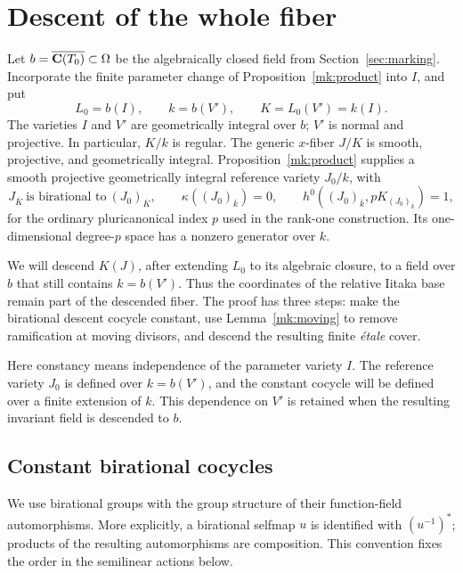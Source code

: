 \section{Descent of the whole fiber}
\label{ds:section}

Let $b=\overline{\mathbf C(T_0)}\subset\Omega$ be the algebraically closed
field from Section~\ref{sec:marking}.  Incorporate the finite parameter
change of Proposition~\ref{mk:product} into $I$, and put
\begin{equation}
 L_0=b(I),\qquad k=b(V'),\qquad K=L_0(V')=k(I).
 \label{ds:fields}
\end{equation}
The varieties $I$ and $V'$ are geometrically integral over $b$;
$V'$ is normal and projective.  In particular, $K/k$ is regular.
The generic $x$-fiber $J/K$ is smooth, projective, and geometrically
integral.  Proposition~\ref{mk:product} supplies a smooth projective
geometrically integral reference variety $J_0/k$, with
\begin{equation}
 J_{\overline K}\ \text{is birational to}\ (J_0)_{\overline K},
 \qquad
 \kappa((J_0)_{\overline k})=0,
 \qquad
 h^0((J_0)_{\overline k},pK_{(J_0)_{\overline k}})=1,
 \label{ds:constant-fiber}
\end{equation}
for the ordinary pluricanonical index $p$ used in the rank-one
construction.  Its one-dimensional degree-$p$ space has a nonzero
generator over $k$.

We will descend $K(J)$, after extending $L_0$ to its algebraic closure,
to a field over $b$ that still contains $k=b(V')$.  Thus the coordinates
of the relative Iitaka base remain part of the descended fiber.
The proof has three steps: make the birational descent cocycle constant,
use Lemma~\ref{mk:moving} to remove ramification at moving divisors,
and descend the resulting finite \emph{\'etale} cover.

Here constancy means independence of the parameter variety $I$.
The reference variety $J_0$ is defined over $k=b(V')$, and the
constant cocycle will be defined over a finite extension of $k$.
This dependence on $V'$ is retained when the resulting invariant
field is descended to $b$.

\subsection{Constant birational cocycles}

We use birational groups with the group structure of their
function-field automorphisms.  More explicitly, a birational
selfmap $u$ is identified with $(u^{-1})^*$; products of the resulting
automorphisms are composition.  This convention fixes the order in
the semilinear actions below.

